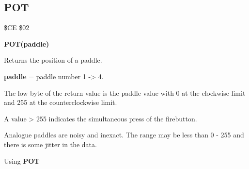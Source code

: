 
\newpage
\subsection{POT}
\begin{description}[leftmargin=3cm,style=nextline]
\item [Token:] \$CE \$02
\item [Format:] {\bf POT(paddle)}
\item [Usage:]  Returns the position of a paddle.

                {\bf paddle} = paddle number 1 -> 4.

                The low byte of the return value is the
                paddle value
                with 0 at the clockwise limit and 255 at the
                counterclockwise limit.

                A value > 255 indicates the simultaneous press
                of the firebutton.

\item [Remarks:] Analogue paddles are noisy and inexact.
                 The range may be less than 0 - 255 and there
                 is some jitter in the data.


\item [Example:] Using {\bf POT}

\end{description}


\newpage

